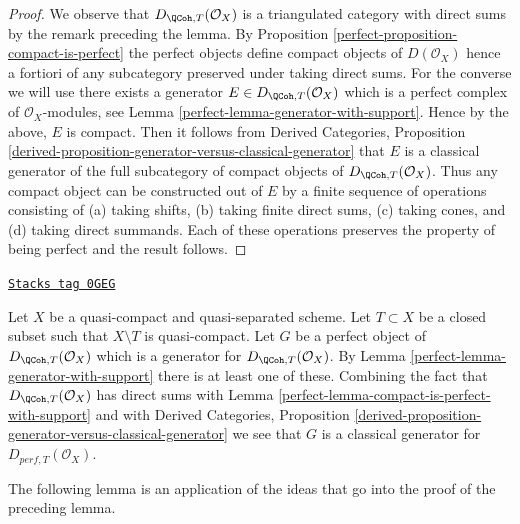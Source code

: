 \begin{proof}

We observe that $D_{\QCoh, T}(\mathcal{O}_X)$ is a triangulated
category with direct sums by the remark preceding the lemma.
By Proposition \ref{perfect-proposition-compact-is-perfect}
the perfect objects define compact objects of $D(\mathcal{O}_X)$
hence a fortiori of any subcategory preserved under taking direct
sums. For the converse we will use there exists a generator
$E \in D_{\QCoh, T}(\mathcal{O}_X)$ which is a perfect complex
of $\mathcal{O}_X$-modules, see
Lemma \ref{perfect-lemma-generator-with-support}.
Hence by the above, $E$ is compact. Then it follows from
Derived Categories, Proposition
\ref{derived-proposition-generator-versus-classical-generator}
that $E$ is a classical generator of the full subcategory
of compact objects of $D_{\QCoh, T}(\mathcal{O}_X)$.
Thus any compact object can be constructed out of $E$ by
a finite sequence of operations consisting of
(a) taking shifts, (b) taking finite direct sums, (c) taking cones, and
(d) taking direct summands. Each of these operations preserves
the property of being perfect and the result follows.
\end{proof}

\begin{remark}
\label{perfect-remark-classical-generator-with-support}
\href{https://stacks.math.columbia.edu/tag/0GEG}{\texttt{Stacks tag 0GEG}}

Let $X$ be a quasi-compact and quasi-separated scheme.
Let $T \subset X$ be a closed subset such that $X \setminus T$
is quasi-compact. Let $G$ be a
perfect object of $D_{\QCoh, T}(\mathcal{O}_X)$ which is a generator for
$D_{\QCoh, T}(\mathcal{O}_X)$. By Lemma \ref{perfect-lemma-generator-with-support}
there is at least one of these. Combining the fact that
$D_{\QCoh, T}(\mathcal{O}_X)$ has direct sums with
Lemma \ref{perfect-lemma-compact-is-perfect-with-support} and with
Derived Categories, Proposition
\ref{derived-proposition-generator-versus-classical-generator}
we see that $G$ is a classical generator for $D_{perf, T}(\mathcal{O}_X)$.
\end{remark}

The following lemma is an application of the ideas that go into
the proof of the preceding lemma.

